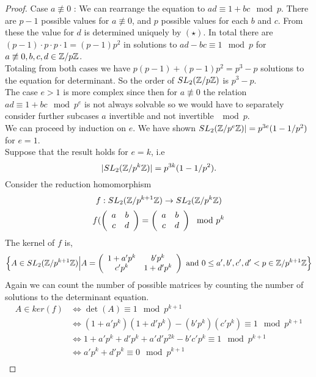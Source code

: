 \begin{proof}
    Case $a\not \equiv 0$ : We can rearrange the equation to $ad \equiv 1+bc \mod p$. There are $p-1$ possible values for $a \not \equiv 0$, and $p$ possible values for each $b$ and $c$. From these the value for $d$ is determined uniquely by $(\star)$. In total there are $(p-1)\cdot p \cdot p \cdot 1 = (p-1)p^2$ in solutions to $ad -bc \equiv 1 \mod p$ for $a \not \equiv 0, b,c,d \in \znz[p]$.
\\    
    Totaling from both cases we have $p(p-1) + (p-1)p^2 = p^3 - p$ solutions to the equation for determinant. So the order of $\sltznz[p]$  is $p^3 - p$.\\
    The case  $e>1$ is more complex since then for $a\not\equiv 0$ the relation $ad \equiv 1+bc \mod p^e$ is not always solvable so we would have to separately consider further subcases $a$ invertible and not invertible $\mod p$. \\ 
We can proceed by induction on $e$.  We have shown $\sltznz[p^e] \vert = p^{3e}(1 - 1/p^2)$ for $e =1$. \\
Suppose that the result holds for $e = k$, i.e
$$\vert \sltznz[p^k] \vert = p^{3k}(1 - 1/p^2).$$ 
Consider the reduction homomorphism 
$$f: \sltznz[p^{k+1}] \to \sltznz[p^k] $$
$$f(\left(\begin{array}{ c c }  a& b \\ c & d \end{array} \right) = \left(\begin{array}{ c c }  a & b \\ c & d \end{array} \right) \mod p^k$$
The kernel of $f$ is, $$\Big \lbrace A \in \sltznz[p^{k+1}]  \Big \vert A = \left(
      \begin{array}{ c c }
         1+a'p^k & b'p^k \\
         c'p^k &  1+d'p^k 
      \end{array} \right) \text{ and } 0 \leq a',b',c',d' < p \in \mathbb{Z}/p^{k+1}\mathbb{Z} \Big \rbrace $$
Again we can count the number of possible matrices by counting the number of solutions to the determinant equation.
\begin{align*}
A\in ker(f) &\iff \det(A) \equiv 1 \mod p^{k+1}\\
			 & \iff  ( 1+a'p^k)( 1+d'p^k ) - (b'p^k)(c'p^k) \equiv 1 \mod p^{k+1}\\
             & \iff  1 + a'p^k + d'p^k + a'd'p^{2k} - b'c'p^k \equiv 1 \mod p^{k+1}\\
             & \iff   a'p^k + d'p^k  \equiv 0\mod p^{k+1}\\

\end{align*}
\end{proof}
